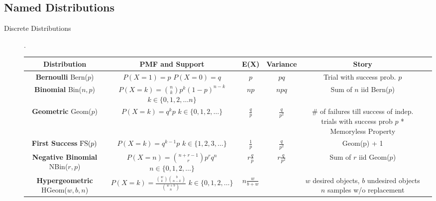 \documentclass[11pt]{article}
\theoremstyle{definition}
\theoremstyle{remark}
\newcommand{\Bin}{\textnormal{Bin}}
\newcommand{\Bern}{\textnormal{Bern}}
\newcommand{\Geom}{\textnormal{Geom}}
\newcommand{\FS}{\textnormal{FS}}
\newcommand{\NBin}{\textnormal{NBin}}
\newcommand{\HGeom}{\textnormal{HGeom}}
\begin{document}
\begin{landscape}
\section{Named Distributions}

\begin{description}
\item[Discrete Distributions] .

\noindent \begin{center}
\begin{tabular}{cccccc}
\textbf{Distribution} & \textbf{PMF and Support} & \textbf{E(X)}  & \textbf{Variance} & \textbf{Story}\\
\hline
\shortstack{\textbf{Bernoulli} \\ \Bern($p$)} & \shortstack{$P(X=1) = p$ \\$ P(X=0) = q$} & $p$ & $pq$ & Trial with success prob. $p$ \\
\hline
\shortstack{\textbf{Binomial} \\ \Bin($n, p$)} & \shortstack{$P(X=k) = \binom{n}{k} p^k(1-p)^{n-k}$  \\ $k \in \{0, 1, 2, \dots n\}$}& $np$ & $npq$ & Sum of $n$ iid Bern($p$) \\
\hline
\shortstack{\textbf{Geometric} \\ \Geom($p$)} & \shortstack{$P(X=k) = q^kp$  \\ $k \in \{0, 1, 2, \dots \}$}& $\frac{q}{p}$ & $\frac{q}{p^2}$ & \shortstack{\# of failures till success of indep. \\ trials with success prob $p$ \\ * Memoryless Property} \\
\hline
\shortstack{\textbf{First Success} \\ $\FS(p)$} & \shortstack{$P(X=k) = q^{k-1}p$  \\ $k \in \{1, 2, 3, \dots \}$}& $\frac{1}{p}$ & $\frac{q}{p^2}$ & \Geom(p) + 1\\
\hline
\shortstack{\textbf{Negative Binomial} \\ \NBin($r, p$)} & \shortstack{$P(X=n) = \binom{n+r-1}{r}p^rq^n$ \\ $n \in \{0, 1, 2, \dots \}$} & $r\frac{q}{p}$ & $r\frac{q}{p^2}$ &  Sum of $r$ iid Geom($p$)\\
\hline
\shortstack{\textbf{Hypergeometric} \\ \HGeom($w, b, n$)} & \shortstack{$P(X=k) = \frac{{\binom{w}{k}}{\binom{b}{n-k}}}{{\binom{w +b}{n}}}$ \\ $k \in \{0, 1, 2, \dots \}$} & $n\frac{w}{b+w}$ & & \shortstack{$w$ desired objects, $b$ undesired objects \\ $n$ samples w/o replacement} \\

\end{tabular}
\end{center}
\end{description}
\end{landscape}
\end{document}
